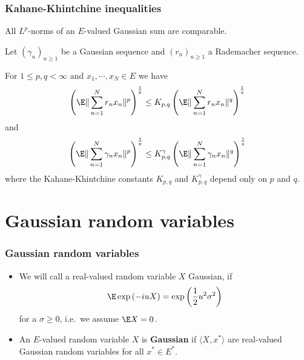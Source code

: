 \begin{frame}
    \frametitle{Kahane-Khintchine inequalities}
   
    All $L^{p}$-norms of an $E$-valued Gaussian sum are comparable. 

    \begin{theorem}
    Let $(\gamma_n)_{n \geq 1}$ be a Gaussian sequence and $(r_n)_{n \geq 1}$
    a Rademacher sequence.

    For $1 \leq p,q < \infty$ and $x_1, \cdots , x_N \in E$ we have
    \begin{equation*}
        \left( \E \|  \sum_{n=1}^{N} r_n x_n \|^p \right)^{\frac{1}{p}}
        \leq K_{p,q}
        \left( \E \| \sum_{n=1}^{N} r_n x_n \|^q \right)^{\frac{1}{q}}
    \end{equation*}
    and
    \begin{equation*}
        \left( \E \|  \sum_{n=1}^{N} \gamma_n x_n \|^p \right)^{\frac{1}{p}}
        \leq K_{p,q}^{\gamma}
        \left( \E \| \sum_{n=1}^{N} \gamma_n x_n \|^q \right)^{\frac{1}{q}}
    \end{equation*}
    where the Kahane-Khintchine constants $K_{p,q}$ and $K^{\gamma}_{p,q}$
    depend only on $p$ and $q$. 
    \end{theorem}

\end{frame}


\section{Gaussian random variables}
\begin{frame}
    \frametitle{Gaussian random variables}
   
    \begin{itemize}
        \item We will call a real-valued random variable $X$ Gaussian, if 
            \begin{equation*}
                \E \exp\left( -i u X \right) = \exp \left( \frac{1}{2} u^2 \sigma^2 \right)
            \end{equation*}
            for a $\sigma\geq 0$, i.e.\ we assume $\E X=0$. 
        \item An $E$-valued random variable $X$ is \textbf{Gaussian} if $
            \langle X, x^* \rangle $ are real-valued Gaussian random variables
            for all $x^* \in E^*$.
    \end{itemize}
\end{frame}



